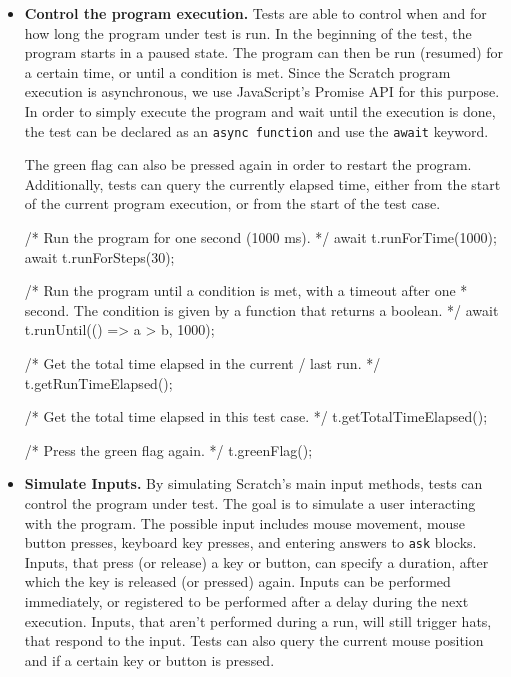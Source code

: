 \begin{itemize}
    \item \textbf{Control the program execution.}
        Tests are able to control when and for how long the program under test is run.
        In the beginning of the test, the program starts in a paused state.
        The program can then be run (resumed) for a certain time, or until a condition is met.
        Since the Scratch program execution is asynchronous, we use JavaScript's Promise API for this purpose.
        In order to simply execute the program and wait until the execution is done, the test can be declared as an \texttt{async function} and use the \texttt{await} keyword.

        The green flag can also be pressed again in order to restart the program.
        Additionally, tests can query the currently elapsed time,
        either from the start of the current program execution,
        or from the start of the test case.
        \begin{javascriptcode}
            /* Run the program for one second (1000 ms). */
            await t.runForTime(1000);
            await t.runForSteps(30);

            /* Run the program until a condition is met, with a timeout after one
             * second. The condition is given by a function that returns a boolean. */
            await t.runUntil(() => a > b, 1000);

            /* Get the total time elapsed in the current / last run. */
            t.getRunTimeElapsed();

            /* Get the total time elapsed in this test case. */
            t.getTotalTimeElapsed();

            /* Press the green flag again. */
            t.greenFlag();
        \end{javascriptcode}
    \item \textbf{Simulate Inputs.}
        By simulating Scratch's main input methods, tests can control the program under test.
        The goal is to simulate a user interacting with the program.
        The possible input includes mouse movement, mouse button presses, keyboard key presses, and entering answers to \texttt{ask} blocks.
        Inputs, that press (or release) a key or button, can specify a duration, after which the key is released (or pressed) again.
        Inputs can be performed immediately, or registered to be performed after a delay during the next execution.
        Inputs, that aren't performed during a run, will still trigger hats, that respond to the input.
        Tests can also query the current mouse position and if a certain key or button is pressed.


\end{itemize}
